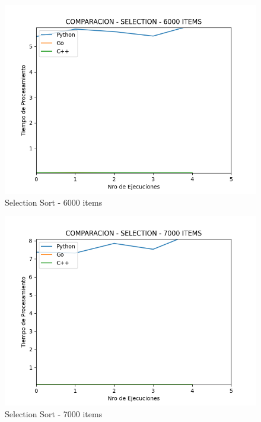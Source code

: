 \documentclass[12pt]{article} %
\begin{document}
    \vspace{5mm}
    
    \begin{figure}[H]
    \centering
    \includegraphics[width=\textwidth]{selection_6000}
    \caption{Selection Sort - 6000 items}
    \end{figure}

    \vspace{5mm}
    
    \begin{figure}[H]
    \centering
    \includegraphics[width=\textwidth]{selection_7000}
    \caption{Selection Sort - 7000 items}
    \end{figure}
\end{document}
